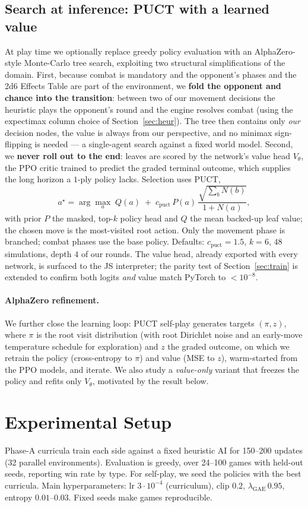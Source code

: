 \documentclass{article}
\begin{document}
\subsection{Search at inference: PUCT with a learned value}
\label{sec:puct}
At play time we optionally replace greedy policy evaluation with an AlphaZero-style
Monte-Carlo tree search, exploiting two structural simplifications of the domain. First,
because combat is mandatory and the opponent's phases and the 2d6 Effects Table are part
of the environment, we \textbf{fold the opponent and chance into the transition}: between
two of our movement decisions the heuristic plays the opponent's round and the engine
resolves combat (using the expectimax column choice of Section~\ref{sec:heur}). The tree
then contains only \emph{our} decision nodes, the value is always from our perspective,
and no minimax sign-flipping is needed --- a single-agent search against a fixed world
model. Second, we \textbf{never roll out to the end}: leaves are scored by the network's
value head $V_\theta$, the PPO critic trained to predict the graded terminal outcome,
which supplies the long horizon a $1$-ply policy lacks. Selection uses PUCT,
\[
a^\star=\arg\max_a\; Q(a)\;+\;c_{\text{puct}}\,P(a)\,\frac{\sqrt{\sum_b N(b)}}{1+N(a)},
\]
with prior $P$ the masked, top-$k$ policy head and $Q$ the mean backed-up leaf value; the
chosen move is the most-visited root action. Only the movement phase is branched; combat
phases use the base policy. Defaults: $c_{\text{puct}}{=}1.5$, $k{=}6$, $48$ simulations,
depth $4$ of our rounds. The value head, already exported with every network, is surfaced
to the JS interpreter; the parity test of Section~\ref{sec:train} is extended to confirm
both logits \emph{and} value match PyTorch to $<10^{-8}$.

\paragraph{AlphaZero refinement.} We further close the learning loop: PUCT self-play
generates targets $(\pi,z)$, where $\pi$ is the root visit distribution (with root
Dirichlet noise and an early-move temperature schedule for exploration) and $z$ the graded
outcome, on which we retrain the policy (cross-entropy to $\pi$) and value (MSE to $z$),
warm-started from the PPO models, and iterate. We also study a \emph{value-only} variant
that freezes the policy and refits only $V_\theta$, motivated by the result below.

\section{Experimental Setup}
Phase-A curricula train each side against a fixed heuristic AI for 150--200 updates (32
parallel environments). Evaluation is greedy, over 24--100 games with held-out seeds,
reporting win rate by type. For self-play, we seed the policies with the best curricula.
Main hyperparameters: lr $3\cdot10^{-4}$ (curriculum), clip $0.2$,
$\lambda_{\text{GAE}}\,0.95$, entropy $0.01$--$0.03$. Fixed seeds make games reproducible.
\end{document}
